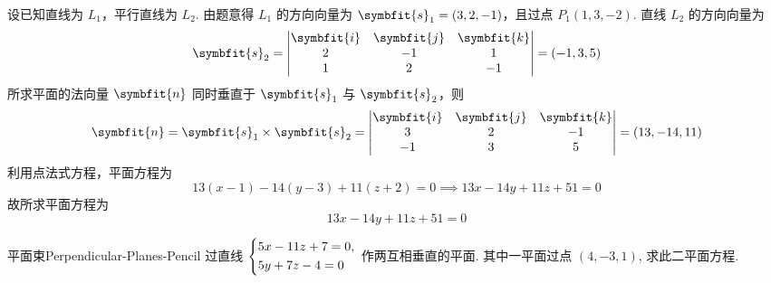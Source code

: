 \begin{solution}
    设已知直线为 $L_1$，平行直线为 $L_2$.
    由题意得 $L_1$ 的方向向量为 $\symbfit{s}_1 = (3, 2, -1)$，且过点 $P_1(1, 3, -2)$.
    直线 $L_2$ 的方向向量为
    \begin{equation}
        \symbfit{s}_2 = \begin{vmatrix} \symbfit{i} & \symbfit{j} & \symbfit{k} \\ 2 & -1 & 1 \\ 1 & 2 & -1 \end{vmatrix} = (-1, 3, 5)
    \end{equation}
    所求平面的法向量 $\symbfit{n}$ 同时垂直于 $\symbfit{s}_1$ 与 $\symbfit{s}_2$，则
    \begin{equation}
        \symbfit{n} = \symbfit{s}_1 \times \symbfit{s}_2 = \begin{vmatrix} \symbfit{i} & \symbfit{j} & \symbfit{k} \\ 3 & 2 & -1 \\ -1 & 3 & 5 \end{vmatrix} = (13, -14, 11)
    \end{equation}
    利用点法式方程，平面方程为
    \begin{equation}
        13(x - 1) - 14(y - 3) + 11(z + 2) = 0 \implies 13x - 14y + 11z + 51 = 0
    \end{equation}
    故所求平面方程为
    \begin{equation}
        \boxed{13x - 14y + 11z + 51 = 0}
    \end{equation}
\end{solution}

\begin{problem}{平面束}{Perpendicular-Planes-Pencil}
    过直线 $\begin{dcases} 5x - 11z + 7 = 0, \\ 5y + 7z - 4 = 0 \end{dcases}$ 作两互相垂直的平面. 其中一平面过点 $(4, -3, 1)$, 求此二平面方程.
\end{problem}

